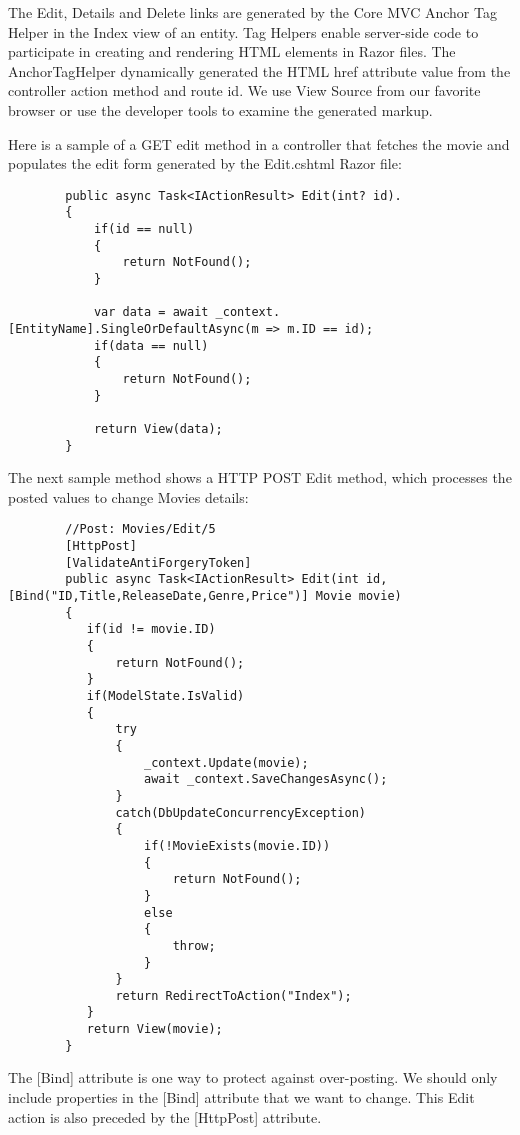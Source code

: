 \documentclass{report}
\begin{document}
    The Edit, Details and Delete links are generated by the Core MVC Anchor Tag Helper
    in the Index view of an entity. Tag Helpers enable server-side code to participate
    in creating and rendering HTML elements in Razor files.
    The AnchorTagHelper dynamically generated the HTML href attribute value from the
    controller action method and route id. We use View Source from our favorite browser
    or use the developer tools to examine the generated markup.

    Here is a sample of a GET edit method in a controller that fetches the movie and populates
    the edit form generated by the Edit.cshtml Razor file:
    
    \lstset{style=sharpc}
    \begin{lstlisting}
        public async Task<IActionResult> Edit(int? id).
        {
            if(id == null)
            {
                return NotFound();
            }

            var data = await _context.[EntityName].SingleOrDefaultAsync(m => m.ID == id);
            if(data == null)
            {
                return NotFound();
            }

            return View(data);
        }
    \end{lstlisting}

    The next sample method shows a HTTP POST Edit method, which processes
    the posted values to change Movies details:
    \lstset{style=sharpc}
    \begin{lstlisting}
        //Post: Movies/Edit/5
        [HttpPost]
        [ValidateAntiForgeryToken]
        public async Task<IActionResult> Edit(int id, [Bind("ID,Title,ReleaseDate,Genre,Price")] Movie movie)
        {
           if(id != movie.ID)
           {
               return NotFound();
           }
           if(ModelState.IsValid)
           {
               try
               {
                   _context.Update(movie);
                   await _context.SaveChangesAsync();
               }
               catch(DbUpdateConcurrencyException)
               {
                   if(!MovieExists(movie.ID))
                   {
                       return NotFound();
                   }
                   else
                   {
                       throw;
                   }
               }
               return RedirectToAction("Index");
           }
           return View(movie);
        }
    \end{lstlisting}

    The [Bind] attribute is one way to protect against over-posting. We
    should only include properties in the [Bind] attribute that we want
    to change. This Edit action is also preceded by the [HttpPost] attribute.
\end{document}
